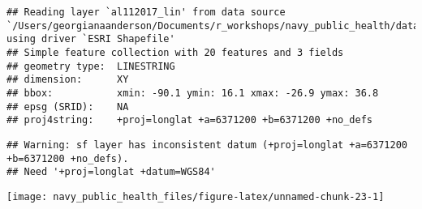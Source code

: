 \documentclass[]{tufte-book}
\newenvironment{Shaded}{}{}
\newcommand{\DataTypeTok}[1]{\textcolor[rgb]{0.56,0.13,0.00}{#1}}
\newcommand{\DecValTok}[1]{\textcolor[rgb]{0.25,0.63,0.44}{#1}}
\newcommand{\FloatTok}[1]{\textcolor[rgb]{0.25,0.63,0.44}{#1}}
\newcommand{\KeywordTok}[1]{\textcolor[rgb]{0.00,0.44,0.13}{\textbf{#1}}}
\newcommand{\NormalTok}[1]{#1}
\newcommand{\OperatorTok}[1]{\textcolor[rgb]{0.40,0.40,0.40}{#1}}
\newcommand{\StringTok}[1]{\textcolor[rgb]{0.25,0.44,0.63}{#1}}
\begin{document}
\begin{verbatim}
## Reading layer `al112017_lin' from data source `/Users/georgianaanderson/Documents/r_workshops/navy_public_health/data/al112017_best_track' using driver `ESRI Shapefile'
## Simple feature collection with 20 features and 3 fields
## geometry type:  LINESTRING
## dimension:      XY
## bbox:           xmin: -90.1 ymin: 16.1 xmax: -26.9 ymax: 36.8
## epsg (SRID):    NA
## proj4string:    +proj=longlat +a=6371200 +b=6371200 +no_defs
\end{verbatim}

\begin{Shaded}
\end{Shaded}

\begin{verbatim}
## Warning: sf layer has inconsistent datum (+proj=longlat +a=6371200 +b=6371200 +no_defs).
## Need '+proj=longlat +datum=WGS84'
\end{verbatim}

\texttt{[image: navy\_public\_health\_files/figure-latex/unnamed-chunk-23-1]}

\begin{Shaded}
\end{Shaded}
\end{document}
